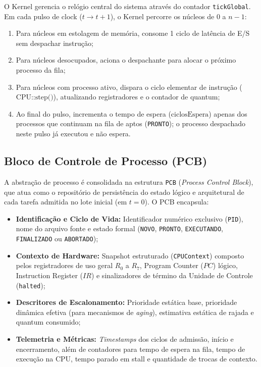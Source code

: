 \documentclass[conference]{IEEEtran}
\begin{document}
O Kernel gerencia o relógio central do sistema através do contador \texttt{tickGlobal}. Em cada pulso de clock ($t \to t + 1$), o Kernel percorre os núcleos de $0$ a $n-1$:
\begin{enumerate}
    \item Para núcleos em estolagem de memória, consome 1 ciclo de latência de E/S sem despachar instrução;
    \item Para núcleos desocupados, aciona o despachante para alocar o próximo processo da fila;
    \item Para núcleos com processo ativo, dispara o ciclo elementar de instrução ($\text{CPU::step()}$), atualizando registradores e o contador de quantum;
    \item Ao final do pulso, incrementa o tempo de espera ($\text{ciclosEspera}$) apenas dos processos que continuam na fila de aptos (\texttt{PRONTO}); o processo despachado neste pulso já executou e não espera.
\end{enumerate}

\subsection{Bloco de Controle de Processo (PCB)}
A abstração de processo é consolidada na estrutura \texttt{PCB} (\textit{Process Control Block}), que atua como o repositório de persistência do estado lógico e arquitetural de cada tarefa admitida no lote inicial (em $t = 0$). O PCB encapsula:
\begin{itemize}
    \item \textbf{Identificação e Ciclo de Vida:} Identificador numérico exclusivo (\texttt{PID}), nome do arquivo fonte e estado formal (\texttt{NOVO}, \texttt{PRONTO}, \texttt{EXECUTANDO}, \texttt{FINALIZADO} ou \texttt{ABORTADO});
    \item \textbf{Contexto de Hardware:} Snapshot estruturado (\texttt{CPUContext}) composto pelos registradores de uso geral $R_0$ a $R_7$, Program Counter ($PC$) lógico, Instruction Register ($IR$) e sinalizadores de término da Unidade de Controle (\texttt{halted});
    \item \textbf{Descritores de Escalonamento:} Prioridade estática base, prioridade dinâmica efetiva (para mecanismos de \textit{aging}), estimativa estática de rajada e quantum consumido;
    \item \textbf{Telemetria e Métricas:} \textit{Timestamps} dos ciclos de admissão, início e encerramento, além de contadores para tempo de espera na fila, tempo de execução na CPU, tempo parado em stall e quantidade de trocas de contexto.
\end{itemize}
\end{document}
